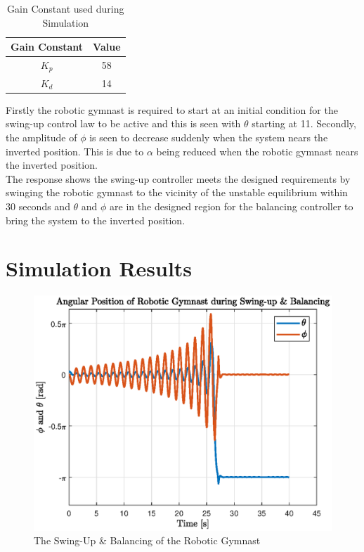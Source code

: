 \begin{table}[]
	\centering
	\begin{tabular}{|c|c|}
		\hline
		Gain Constant & Value \\
		\hline
		\hline
		$K_{p}$  & 58 \\
		\hline
		$K_{d}$  & 14 \\
		\hline
	\end{tabular}
	\caption{Gain Constant used during Simulation}
	\label{table:gain_constants}
	\end{table}

Firstly the robotic gymnast is required to start at an initial condition for the swing-up control law to be active and this is seen with $\theta$ starting at 11\textdegree. Secondly, the amplitude of $\phi$ is seen to decrease suddenly when the system nears the inverted position. This is due to $\alpha$ being reduced when the robotic gymnast nears the inverted position.\\

The response shows the swing-up controller meets the designed requirements by swinging the robotic gymnast to the vicinity of the unstable equilibrium within 30 seconds and $\theta$ and $\phi$ are in the designed region for the balancing controller to bring the system to the inverted position.



\section{Simulation Results}
\begin{figure}[h]
	\centering
	\includegraphics[scale=1]{./figs/swingup_balance}
	\caption{The Swing-Up \& Balancing of the Robotic Gymnast}
	\label{fig:swingup_balance}
\end{figure}

